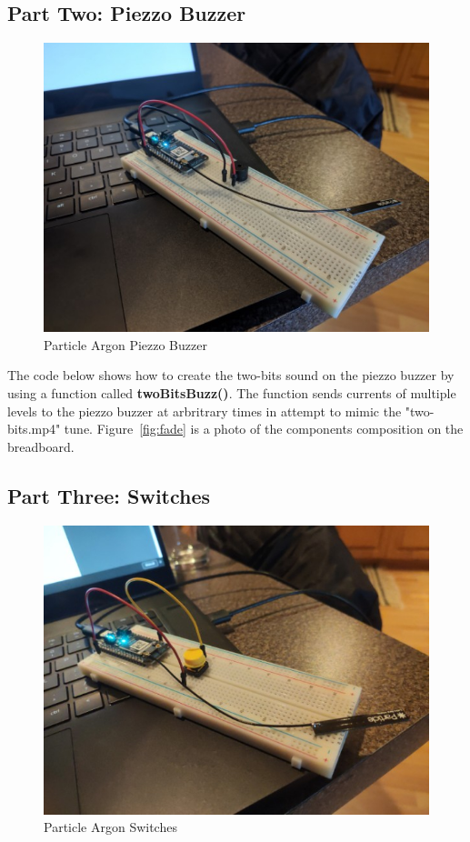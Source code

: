 \documentclass{article}
\begin{document}
\subsection{Part Two: Piezzo Buzzer}
\begin{figure}[H]
\center
\includegraphics[width=\textwidth]{images/buzzer.jpeg}
\caption{Particle Argon Piezzo Buzzer}
\label{fig:buzzer}
\end{figure}

The code below shows how to create the two-bits sound on the piezzo buzzer by using a function called \textbf{twoBitsBuzz()}. The function sends currents of multiple levels to the piezzo buzzer at arbritrary times in attempt to mimic the "two-bits.mp4" tune. Figure~\ref{fig:fade} is a photo of the components composition on the breadboard.\\



\subsection{Part Three: Switches}
\begin{figure}[H]
\center
\includegraphics[width=\textwidth]{images/switches.jpeg}
\caption{Particle Argon Switches}
\label{fig:switches}
\end{figure}
\end{document}
